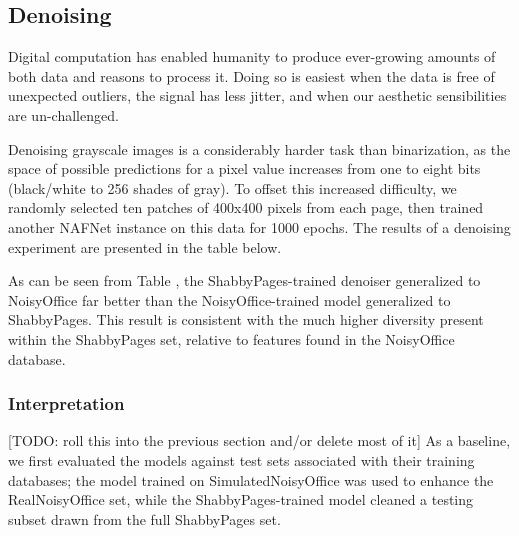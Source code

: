 \documentclass[runningheads]{llncs}
\begin{document}
\subsection{Denoising}
Digital computation has enabled humanity to produce ever-growing amounts of both data and reasons to process it.
Doing so is easiest when the data is free of unexpected outliers, the signal has less jitter, and when our aesthetic sensibilities are un-challenged.

Denoising grayscale images is a considerably harder task than binarization, as the space of possible predictions for a pixel value increases from one to eight bits (black/white to 256 shades of gray).
To offset this increased difficulty, we randomly selected ten patches of 400x400 pixels from each page, then trained another NAFNet instance on this data for 1000 epochs. The results of a denoising experiment are presented in the table below.

\begin{table}[]
    \centering
    \caption{Document image *denoising* cross-test performance of NAFNet models trained on ShabbyPages and NoisyOffice.}
    \label{tab:denoising_results}
\end{table}

As can be seen from Table \cite{tab:denoising_results}, the ShabbyPages-trained denoiser generalized to NoisyOffice far better than the NoisyOffice-trained model generalized to ShabbyPages. This result is consistent with the much higher diversity present within the ShabbyPages set, relative to features found in the NoisyOffice database.

\subsubsection{Interpretation} [TODO: roll this into the previous section and/or delete most of it]
As a baseline, we first evaluated the models against test sets associated with their training databases; the model trained on SimulatedNoisyOffice was used to enhance the RealNoisyOffice set, while the ShabbyPages-trained model cleaned a testing subset drawn from the full ShabbyPages set.
\end{document}
